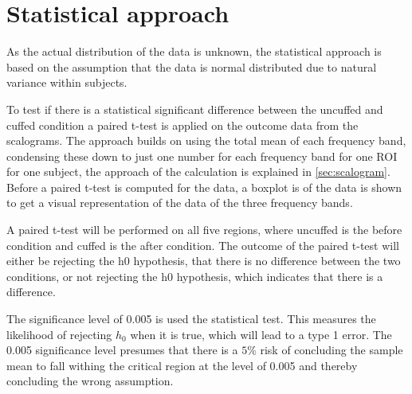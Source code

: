 \section{Statistical approach}
As the actual distribution of the data is unknown, the statistical approach is based on the assumption that the data is normal distributed due to natural variance within subjects. 

To test if there is a statistical significant difference between the uncuffed and cuffed condition a paired t-test is applied on the outcome data from the scalograms. The approach builds on using the total mean of each frequency band, condensing these down to just one number for each frequency band for one ROI for one subject, the approach of the calculation is explained in \ref{sec:scalogram}. 
Before a paired t-test is computed for the data, a boxplot is of the data is shown to get a visual representation of the data of the three frequency bands. 

A paired t-test will be performed on all five regions, where uncuffed is the before condition and cuffed is the after condition. The outcome of the paired t-test will either be rejecting the h0 hypothesis, that there is no difference between the two conditions, or not rejecting the h0 hypothesis, which indicates that there is a difference.

The significance level of 0.005 is used the statistical test. This measures the likelihood of rejecting $h_0$ when it is true, which will lead to a type 1 error. The 0.005 significance level presumes that there is a $5\%$ risk of concluding the sample mean to fall withing the critical region at the level of 0.005 and thereby concluding the wrong assumption. \cite{zar2014}